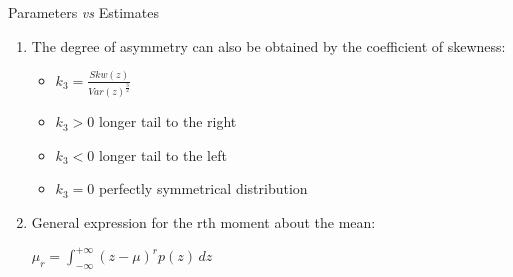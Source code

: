 \documentclass{beamer}
\begin{document}
\begin{frame}{Parameters \textit{vs} Estimates}
  \begin{enumerate}
  
  \item<1-> The degree of asymmetry can also be obtained by the coefficient of skewness:
   
  \begin{itemize}
  
  \item $k_{3} = \frac{Skw(z)}{Var(z)^{\frac{3}{2}}}$
  \vspace{0.2cm}

  \item $k_{3} > 0$ longer tail to the right
  \vspace{0.2cm}

  \item $k_{3} < 0$ longer tail to the left
  \vspace{0.2cm}
  
  \item $k_{3} = 0$ perfectly symmetrical distribution
  \vspace{0.2cm}  
  
  \end{itemize}
  
  \item<2-> General expression for the rth moment about the mean:
  \vspace{0.2cm}
  
  $\mu_{r} = \int_{-\infty}^{+\infty} (z - \mu)^{r} p(z)\, dz$ 
 
      
  \end{enumerate}
  
  
\end{frame}

\end{document}
